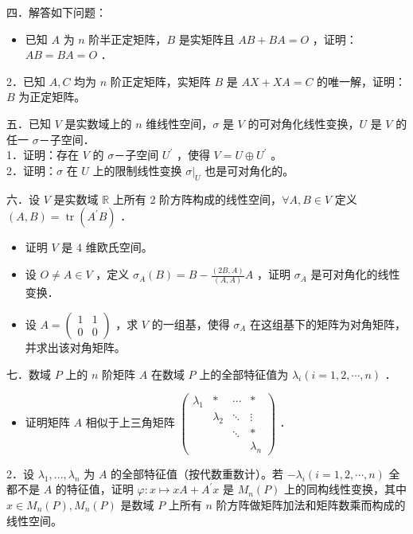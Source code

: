 \documentclass{article}
\begin{document}
四．解答如下问题：

\begin{itemize}

  \item[1．] 已知 \(A\) 为 \(n\) 阶半正定矩阵，\(B\) 是实矩阵且 \(A B+B A=O\) ，证明：\(A B=B A=O\) ．
\end{itemize}

2．已知 \(A, C\) 均为 \(n\) 阶正定矩阵，实矩阵 \(B\) 是 \(A X+X A=C\) 的唯一解，证明：\(B\) 为正定矩阵。

五．已知 \(V\) 是实数域上的 \(n\) 维线性空间，\(\sigma\) 是 \(V\) 的可对角化线性变换，\(U\) 是 \(V\) 的任一 \(\sigma\)－子空间．\\

1．证明：存在 \(V\) 的 \(\sigma\)－子空间 \(U^{\prime}\) ，使得 \(V=U \oplus U^{\prime}\) 。\\

2．证明：\(\sigma\) 在 \(U\) 上的限制线性变换 \(\left.\sigma\right|_{U}\) 也是可对角化的。

六．设 \(V\) 是实数域 \(\mathbb{R}\) 上所有 2 阶方阵构成的线性空间，\(\forall A, B \in V\) 定义 \((A, B)=\operatorname{tr}\left(A^{\prime} B\right)\) ．

\begin{itemize}

  \item[1．] 证明 \(V\) 是 4 维欧氏空间。

  \item[2．] 设 \(O \neq A \in V\) ，定义 \(\sigma_{A}(B)=B-\frac{(2 B, A)}{(A, A)} A\) ，证明 \(\sigma_{A}\) 是可对角化的线性变换．

  \item[3．] 设 \(A=\left(\begin{array}{ll}1 & 1 \\ 0 & 0\end{array}\right)\) ，求 \(V\) 的一组基，使得 \(\sigma_{A}\) 在这组基下的矩阵为对角矩阵，并求出该对角矩阵。
\end{itemize}

七．数域 \(P\) 上的 \(n\) 阶矩阵 \(A\) 在数域 \(P\) 上的全部特征值为 \(\lambda_{i}(i=1,2, \cdots, n)\) ．

\begin{itemize}

  \item[1．] 证明矩阵 \(A\) 相似于上三角矩阵 \(\left(\begin{array}{cccc}\lambda_{1} & * & \cdots & * \\ & \lambda_{2} & \ddots & \vdots \\ & & \ddots & * \\ & & & \lambda_{n}\end{array}\right)\) ．
\end{itemize}

2．设 \(\lambda_1,\ldots,\lambda_n\) 为 \(A\) 的全部特征值（按代数重数计）。若 \(-\lambda_{i}(i=1,2, \cdots, n)\) 全都不是 \(A\) 的特征值，证明 \(\varphi: x \mapsto x A+A^{\prime} x\) 是 \(M_{n}(P)\) 上的同构线性变换，其中 \(x \in M_{n}(P), M_{n}(P)\) 是数域 \(P\) 上所有 \(n\) 阶方阵做矩阵加法和矩阵数乘而构成的线性空间。
\end{document}
